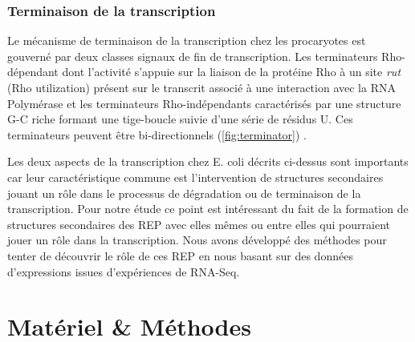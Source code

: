 \documentclass[12pt,a4paper]{report}
\begin{document}
\begin{onehalfspace}
\subsection*{Terminaison de la transcription}
Le mécanisme de terminaison de la transcription chez les procaryotes est gouverné par deux classes signaux de fin de transcription. Les terminateurs Rho-dépendant dont l'activité s'appuie sur la liaison de la protéine Rho à un site \emph{rut} (Rho utilization) présent sur le transcrit associé à une interaction avec la RNA Polymérase et les terminateurs Rho-indépendants caractérisés par une structure G-C riche formant une tige-boucle suivie d'une série de résidus U. Ces terminateurs peuvent être bi-directionnels (\autoref{fig:terminator}) \citep{Henkin2000,Lesnik2001}.  

\begin{figure}
\end{figure}


\vspace{2.8cm}Les deux aspects de la transcription chez E. coli décrits ci-dessus sont importants car leur caractéristique commune est l'intervention de structures secondaires jouant un rôle dans le processus de dégradation ou de terminaison de la transcription. Pour notre étude ce point est intéressant du fait de la formation de structures secondaires des REP avec elles mêmes ou entre elles qui pourraient jouer un rôle dans la transcription. Nous avons développé des méthodes pour tenter de découvrir le rôle de ces REP en nous basant sur des données d'expressions issues d'expériences de RNA-Seq. 

\chapter*{Matériel \& Méthodes}


\end{onehalfspace}
\end{document}
